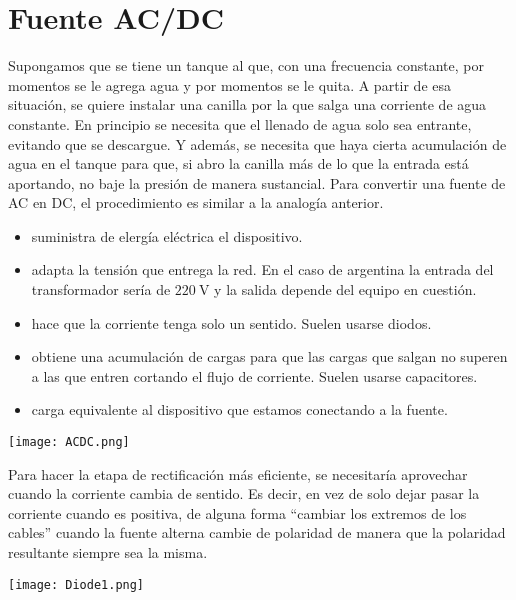 \documentclass[a5paper,12pt,twoside]{book}
\begin{document}
\section{Fuente AC/DC}

Supongamos que se tiene un tanque al que, con una frecuencia constante, por momentos se le agrega agua y por momentos se le quita. A partir de esa situación, se quiere instalar una canilla por la que salga una corriente de agua constante. En principio se necesita que el llenado de agua solo sea entrante, evitando que se descargue. Y además, se necesita que haya cierta acumulación de agua en el tanque para que, si abro la canilla más de lo que la entrada está aportando, no baje la presión de manera sustancial. Para convertir una fuente de AC en DC, el procedimiento es similar a la analogía anterior.

\begin{itemize}
    \item {} suministra de elergía eléctrica el dispositivo.
    \item {} adapta la tensión que entrega la red. En el caso de argentina la entrada del transformador sería de $\SI{220}{\volt}$ y la salida depende del equipo en cuestión.
    \item {} hace que la corriente tenga solo un sentido. Suelen usarse diodos.
    \item {} obtiene una acumulación de cargas para que las cargas que salgan no superen a las que entren cortando el flujo de corriente. Suelen usarse capacitores.
    \item {} carga equivalente al dispositivo que estamos conectando a la fuente.
\end{itemize}

\begin{center}
    \texttt{[image: ACDC.png]}
\end{center}


Para hacer la etapa de rectificación más eficiente, se necesitaría aprovechar cuando la corriente cambia de sentido. Es decir, en vez de solo dejar pasar la corriente cuando es positiva, de alguna forma ``cambiar los extremos de los cables'' cuando la fuente alterna cambie de polaridad de manera que la polaridad resultante siempre sea la misma.

\begin{center}
    \texttt{[image: Diode1.png]}
\end{center}
\end{document}

